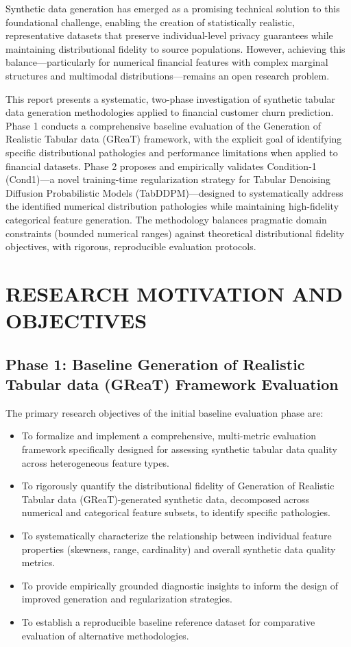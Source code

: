 \documentclass[10pt,conference,a4paper]{IEEEtran}
\begin{document}
Synthetic data generation has emerged as a promising technical solution to this foundational challenge, enabling the creation of statistically realistic, representative datasets that preserve individual-level privacy guarantees while maintaining distributional fidelity to source populations. However, achieving this balance—particularly for numerical financial features with complex marginal structures and multimodal distributions—remains an open research problem.

This report presents a systematic, two-phase investigation of synthetic tabular data generation methodologies applied to financial customer churn prediction. Phase 1 conducts a comprehensive baseline evaluation of the Generation of Realistic Tabular data (GReaT) framework, with the explicit goal of identifying specific distributional pathologies and performance limitations when applied to financial datasets. Phase 2 proposes and empirically validates Condition-1 (Cond1)---a novel training-time regularization strategy for Tabular Denoising Diffusion Probabilistic Models (TabDDPM)---designed to systematically address the identified numerical distribution pathologies while maintaining high-fidelity categorical feature generation. The methodology balances pragmatic domain constraints (bounded numerical ranges) against theoretical distributional fidelity objectives, with rigorous, reproducible evaluation protocols.

\section{RESEARCH MOTIVATION AND OBJECTIVES}

\subsection{Phase 1: Baseline Generation of Realistic Tabular data (GReaT) Framework Evaluation}
The primary research objectives of the initial baseline evaluation phase are:
\begin{itemize}
    \item To formalize and implement a comprehensive, multi-metric evaluation framework specifically designed for assessing synthetic tabular data quality across heterogeneous feature types.
    \item To rigorously quantify the distributional fidelity of Generation of Realistic Tabular data (GReaT)-generated synthetic data, decomposed across numerical and categorical feature subsets, to identify specific pathologies.
    \item To systematically characterize the relationship between individual feature properties (skewness, range, cardinality) and overall synthetic data quality metrics.
    \item To provide empirically grounded diagnostic insights to inform the design of improved generation and regularization strategies.
    \item To establish a reproducible baseline reference dataset for comparative evaluation of alternative methodologies.
\end{itemize}
\end{document}
